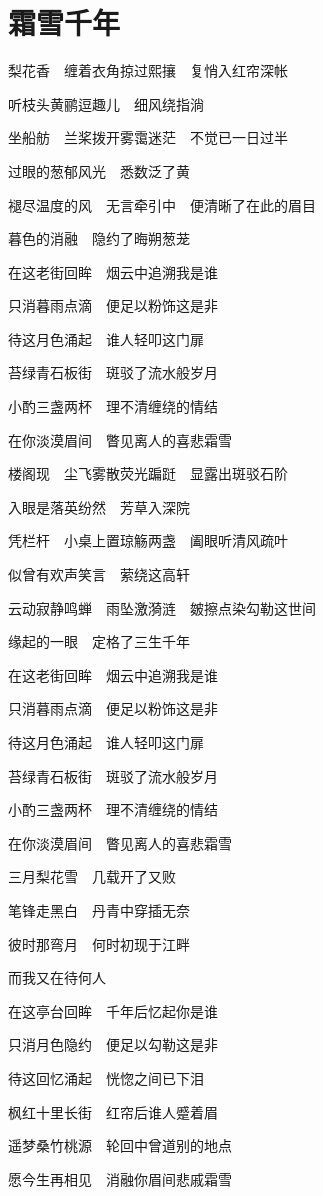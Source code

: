 \section{\texorpdfstring{\fontcn}{}霜雪千年}
{\fontcn

梨花香　缠着衣角掠过熙攘　复悄入红帘深帐

听枝头黄鹂逗趣儿　细风绕指淌

坐船舫　兰桨拨开雾霭迷茫　不觉已一日过半

过眼的葱郁风光　悉数泛了黄

\bigskip

褪尽温度的风　无言牵引中　便清晰了在此的眉目

暮色的消融　隐约了晦朔葱茏

\bigskip

在这老街回眸　烟云中追溯我是谁

只消暮雨点滴　便足以粉饰这是非

待这月色涌起　谁人轻叩这门扉

苔绿青石板街　斑驳了流水般岁月

小酌三盏两杯　理不清缠绕的情结

在你淡漠眉间　瞥见离人的喜悲霜雪

\bigskip

楼阁现　尘飞雾散荧光蹁跹　显露出斑驳石阶

入眼是落英纷然　芳草入深院

凭栏杆　小桌上置琼觞两盏　阖眼听清风疏叶

似曾有欢声笑言　萦绕这高轩

\bigskip

云动寂静鸣蝉　雨坠激漪涟　皴擦点染勾勒这世间

缘起的一眼　定格了三生千年

\bigskip

在这老街回眸　烟云中追溯我是谁

只消暮雨点滴　便足以粉饰这是非

待这月色涌起　谁人轻叩这门扉

苔绿青石板街　斑驳了流水般岁月

小酌三盏两杯　理不清缠绕的情结

在你淡漠眉间　瞥见离人的喜悲霜雪

\bigskip

三月梨花雪　几载开了又败

笔锋走黑白　丹青中穿插无奈

彼时那弯月　何时初现于江畔

而我又在待何人

\bigskip

在这亭台回眸　千年后忆起你是谁

只消月色隐约　便足以勾勒这是非

待这回忆涌起　恍惚之间已下泪

枫红十里长街　红帘后谁人蹙着眉

遥梦桑竹桃源　轮回中曾道别的地点

愿今生再相见　消融你眉间悲戚霜雪

}

